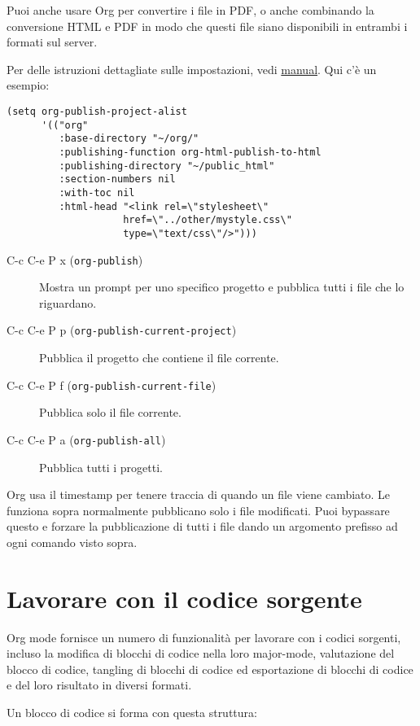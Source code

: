 \documentclass[11pt]{article}
\begin{document}
Puoi anche usare Org per convertire i file in PDF, o anche combinando
la conversione HTML e PDF in modo che questi file siano disponibili in
entrambi i formati sul server.

Per delle istruzioni dettagliate sulle impostazioni, vedi
\url{manual}. Qui c'è un esempio:

\begin{verbatim}
(setq org-publish-project-alist
      '(("org"
         :base-directory "~/org/"
         :publishing-function org-html-publish-to-html
         :publishing-directory "~/public_html"
         :section-numbers nil
         :with-toc nil
         :html-head "<link rel=\"stylesheet\"
                    href=\"../other/mystyle.css\"
                    type=\"text/css\"/>")))
\end{verbatim}

\begin{description}
\item[{C-c C-e P x (\texttt{org-publish})}] Mostra un prompt per uno specifico progetto e pubblica tutti i file
che lo riguardano.

\item[{C-c C-e P p (\texttt{org-publish-current-project})}] Pubblica il progetto che contiene il file corrente.

\item[{C-c C-e P f (\texttt{org-publish-current-file})}] Pubblica solo il file corrente.

\item[{C-c C-e P a (\texttt{org-publish-all})}] Pubblica tutti i progetti.
\end{description}

Org usa il timestamp per tenere traccia di quando un file viene
cambiato. Le funziona sopra normalmente pubblicano solo i file
modificati. Puoi bypassare questo e forzare la pubblicazione di tutti i
file dando un argomento prefisso ad ogni comando visto sopra.

\section{Lavorare con il codice sorgente}
\label{sec:org0788d9f}
Org mode fornisce un numero di funzionalità per lavorare con i codici
sorgenti, incluso la modifica di blocchi di codice nella loro
major-mode, valutazione del blocco di codice, tangling di blocchi di
codice ed esportazione di blocchi di codice e del loro risultato in
diversi formati.

Un blocco di codice si forma con questa struttura:
\end{document}
